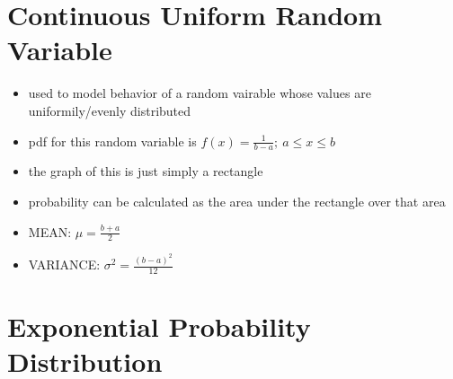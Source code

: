 \section{Continuous Uniform Random Variable}

\begin{itemize}
    \item used to model behavior of a random vairable whose values are uniformily/evenly distributed
    \item pdf for this random variable is $f(x) = \frac{1}{b-a}; \:a \le x \le b$
    \item the graph of this is just simply a rectangle
    \item probability can be calculated as the area under the rectangle over that area
    \item MEAN: $\mu = \frac{b+a}{2}$
    \item VARIANCE: $\sigma^2 = \frac{(b-a)^2}{12}$
\end{itemize}


\section{Exponential Probability Distribution}
